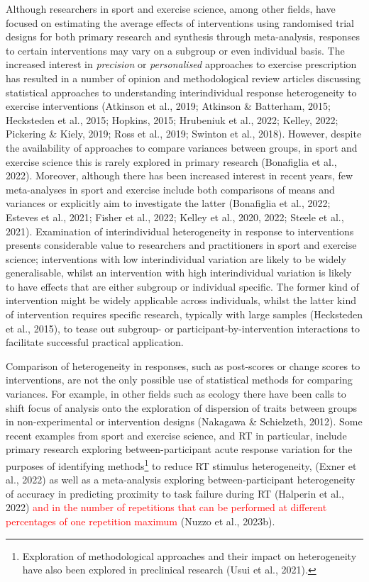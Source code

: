 \documentclass[
]{article}
\begin{document}
Although researchers in sport and exercise science, among other fields, have focused on estimating the average effects of interventions using randomised trial designs for both primary research and synthesis through meta-analysis, responses to certain interventions may vary on a subgroup or even individual basis. The increased interest in \emph{precision} or \emph{personalised} approaches to exercise prescription has resulted in a number of opinion and methodological review articles discussing statistical approaches to understanding interindividual response heterogeneity to exercise interventions (Atkinson et al., 2019; Atkinson \& Batterham, 2015; Hecksteden et al., 2015; Hopkins, 2015; Hrubeniuk et al., 2022; Kelley, 2022; Pickering \& Kiely, 2019; Ross et al., 2019; Swinton et al., 2018). However, despite the availability of approaches to compare variances between groups, in sport and exercise science this is rarely explored in primary research (Bonafiglia et al., 2022). Moreover, although there has been increased interest in recent years, few meta-analyses in sport and exercise include both comparisons of means and variances or explicitly aim to investigate the latter (Bonafiglia et al., 2022; Esteves et al., 2021; Fisher et al., 2022; Kelley et al., 2020, 2022; Steele et al., 2021). Examination of interindividual heterogeneity in response to interventions presents considerable value to researchers and practitioners in sport and exercise science; interventions with low interindividual variation are likely to be widely generalisable, whilst an intervention with high interindividual variation is likely to have effects that are either subgroup or individual specific. The former kind of intervention might be widely applicable across individuals, whilst the latter kind of intervention requires specific research, typically with large samples (Hecksteden et al., 2015), to tease out subgroup- or participant-by-intervention interactions to facilitate successful practical application.

Comparison of heterogeneity in responses, such as post-scores or change scores to interventions, are not the only possible use of statistical methods for comparing variances. For example, in other fields such as ecology there have been calls to shift focus of analysis onto the exploration of dispersion of traits between groups in non-experimental or intervention designs (Nakagawa \& Schielzeth, 2012). Some recent examples from sport and exercise science, and RT in particular, include primary research exploring between-participant acute response variation for the purposes of identifying methods\footnote{Exploration of methodological approaches and their impact on heterogeneity have also been explored in preclinical research (Usui et al., 2021).} to reduce RT stimulus heterogeneity, (Exner et al., 2022) as well as a meta-analysis exploring between-participant heterogeneity of accuracy in predicting proximity to task failure during RT (Halperin et al., 2022) \textcolor{red}{and in the number of repetitions that can be performed at different percentages of one repetition maximum} (Nuzzo et al., 2023b).
\end{document}
